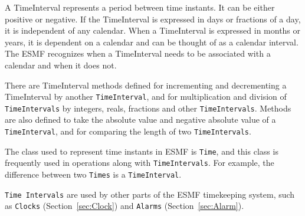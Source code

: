 
A TimeInterval represents a period between time instants.  
It can be either positive or negative.  If the TimeInterval 
is expressed in days or fractions of a day, it is independent of any 
calendar.  When a TimeInterval is expressed in months or years, 
it is dependent on a calendar and can be thought of as a calendar 
interval.  The ESMF recognizes when a TimeInterval needs to be 
associated with a calendar and when it does not.

There are TimeInterval methods defined for incrementing and
decrementing a TimeInterval by another {\tt TimeInterval},
and for multiplication and division of {\tt TimeIntervals} by integers, 
reals, fractions and other {\tt TimeIntervals}.  Methods are also 
defined to take the absolute value and negative absolute value of a 
{\tt TimeInterval}, and for comparing the length of two
{\tt TimeIntervals}.

The class used to represent time instants in ESMF is {\tt Time},
and this class is frequently used in operations along with 
{\tt TimeIntervals}.  For example, the difference between two
{\tt Times} is a {\tt TimeInterval}.  

{\tt Time Intervals} are used by other parts of the ESMF timekeeping
system, such as {\tt Clocks} (Section~\ref{sec:Clock}) and 
{\tt Alarms} (Section~\ref{sec:Alarm}).    





